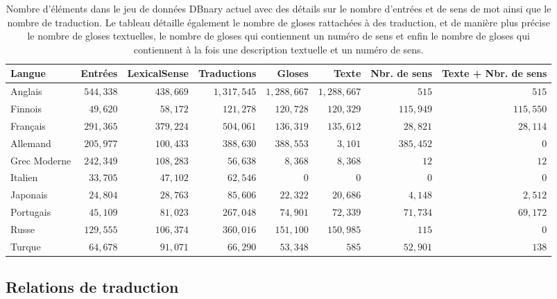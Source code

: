 \documentclass[10pt,a4paper,twoside]{article}
\begin{document}
\begin{table}[htb!]
\begin{center}\begin{footnotesize}
\begin{tabular}{lrrrrrrr}
\textbf{Langue} & \textbf{Entrées} & \textbf{LexicalSense} & \textbf{Traductions} & \textbf{Gloses} & \textbf{Texte} &  \textbf{Nbr. de sens} & \textbf{Texte + Nbr. de sens }\\
\hline
Anglais & $544,338$ & $438,669$ & $1,317,545$ & $1,288,667$ & $1,288,667$ & $515$ & $515$ \\
Finnois & $49,620$ & $58,172$ & $121,278$ & $120,728$ & $120,329$ & $115,949$ & $115,550$ \\
Français & $291,365$ & $379,224$ & $504,061$ & $136,319$ & $135,612$ & $28,821$ & $28,114$ \\
Allemand & $205,977$ & $100,433$ & $388,630$ & $388,553$ & $3,101$ & $385,452$ & $0$ \\
Grec Moderne & $242,349$ & $108,283$ & $56,638$ & $8,368$ & $8,368$ & $12$ & $12$ \\
Italien & $33,705$ & $47,102$ & $62,546$ & $0$ & $0$ & $0$ & $0$ \\
Japonais & $24,804$ & $28,763$ & $85,606$ & $22,322$ & $20,686$ & $4,148$ & $2,512$ \\
Portugais & $45,109$ & $81,023$ & $267,048$ & $74,901$ & $72,339$ & $71,734$ & $69,172$ \\
Russe & $129,555$ & $106,374$ & $360,016$ & $151,100$ & $150,985$ & $115$ & $0$ \\
Turque & $64,678$ & $91,071$ & $66,290$ & $53,348$ & $585$ & $52,901$ & $138$ \\

\hline
\end{tabular}
\caption{Nombre d'éléments dans le jeu de données DBnary actuel avec des détails sur le nombre d'entrées et de sens de mot ainsi que le nombre de traduction. Le tableau détaille également le nombre de gloses rattachées à des traduction, et de manière plus précise le nombre de gloses textuelles, le nombre de gloses qui contiennent un numéro de sens et enfin le nombre de gloses qui contiennent à la fois une description textuelle et un numéro de sens.}
\label{lemon-elts}
\end{footnotesize}\end{center}
\end{table}

\subsection{Relations de traduction}
\end{document}
